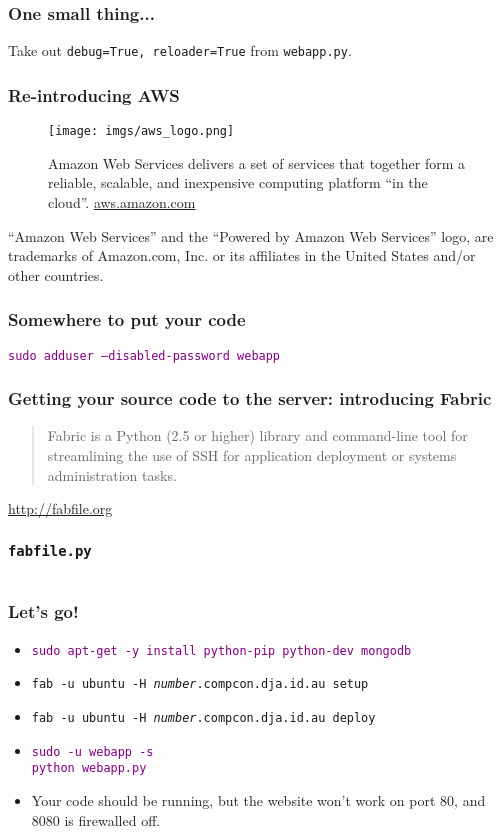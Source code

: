 \documentclass{beamer}
\newcommand\aws[1]{\textcolor{purple}{\texttt{#1}}}
\begin{document}
\begin{frame}
  \frametitle{One small thing...}
  Take out \texttt{debug=True, reloader=True} from \texttt{webapp.py}.
\end{frame}

\begin{frame}
  \frametitle{Re-introducing AWS}
  \begin{figure}[h!]
    \centering
    \texttt{[image: imgs/aws\_logo.png]}
    \caption{Amazon Web Services delivers a set of services that together form a reliable, scalable, and inexpensive computing platform ``in the cloud''. \url{aws.amazon.com}}
    \label{fig:aws_logo}
  \end{figure}

  {\tiny ``Amazon Web Services'' and the ``Powered by Amazon Web
    Services'' logo, are trademarks of Amazon.com, Inc. or its
    affiliates in the United States and/or other countries.}
\end{frame}

\begin{frame}[fragile]
  \frametitle{Somewhere to put your code}

  \aws{sudo adduser --disabled-password webapp}

\end{frame}

\begin{frame}
  \frametitle{Getting your source code to the server: introducing
    Fabric}

  \begin{quote}
  Fabric is a Python (2.5 or higher) library and command-line tool for
  streamlining the use of SSH for application deployment or systems
  administration tasks.
  \end{quote}

  \url{http://fabfile.org}

\end{frame}

\begin{frame}
  \frametitle{\texttt{fabfile.py}}
  \inputminted{python}{../steps/04-deployment/01-demo-app/fabfile.py}
\end{frame}

\begin{frame}
  \frametitle{Let's go!}
  \begin{itemize}

  \item \aws{sudo apt-get -y install python-pip python-dev mongodb}

  \item \texttt{fab -u ubuntu -H \textit{number}.compcon.dja.id.au
      setup}
  \item \texttt{fab -u ubuntu -H \textit{number}.compcon.dja.id.au deploy}

  \item \aws{sudo -u webapp -s}\\
    \aws{python webapp.py}
  
  \item Your code should be running, but the website won't work on
    port 80, and 8080 is firewalled off.

  \end{itemize}
\end{frame}
\end{document}
